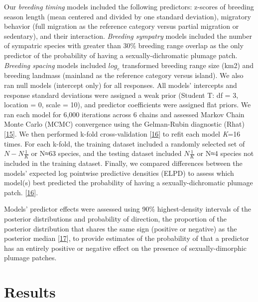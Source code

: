 \documentclass[
  a4paper,
]{article}
\begin{document}
Our \emph{breeding timing} models included the following predictors:
z-scores of breeding season length (mean centered and divided by one
standard deviation), migratory behavior (full migration as the reference
category versus partial migration or sedentary), and their interaction.
\emph{Breeding sympatry} models included the number of sympatric species
with greater than 30\% breeding range overlap as the only predictor of
the probability of having a sexually-dichromatic plumage patch.
\emph{Breeding spacing} models included \(log_{e}\) transformed breeding
range size (km2) and breeding landmass (mainland as the reference
category versus island). We also ran null models (intercept only) for
all responses. All models' intercepts and response standard deviations
were assigned a weak prior (Student T: df = 3, location = 0, scale =
10), and predictor coefficients were assigned flat priors. We ran each
model for 6,000 iterations across 6 chains and assessed Markov Chain
Monte Carlo (MCMC) convergence using the Gelman-Rubin diagnostic (Rhat)
{[}\protect\hyperlink{ref-gelman2013}{15}{]}. We then performed k-fold
cross-validation {[}\protect\hyperlink{ref-vehtari2017}{16}{]} to refit
each model \emph{K}=16 times. For each k-fold, the training dataset
included a randomly selected set of \(N- N\frac{1}{K}\) or N≈63 species,
and the testing dataset included \(N\frac{1}{K}\) or N≈4 species not
included in the training dataset. Finally, we compared differences
between the models' expected log pointwise predictive densities (ELPD)
to assess which model(s) best predicted the probability of having a
sexually-dichromatic plumage patch.
{[}\protect\hyperlink{ref-vehtari2017}{16}{]}⁠.

Models' predictor effects were assessed using 90\% highest-density
intervals of the posterior distributions and probability of direction,
the proportion of the posterior distribution that shares the same sign
(positive or negative) as the posterior median
{[}\protect\hyperlink{ref-makowski2019}{17}{]}, to provide estimates of
the probability of that a predictor has an entirely positive or negative
effect on the presence of sexually-dimorphic plumage patches.

\hypertarget{results}{%
\section{Results}\label{results}}
\end{document}
